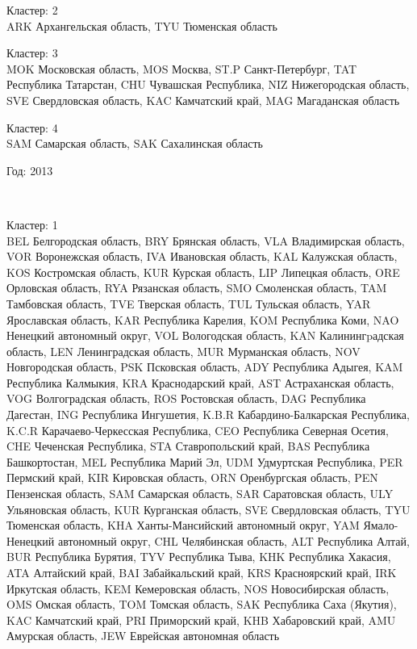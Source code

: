 \documentclass[11pt]{article}
\begin{document}
Кластер:  2 \\
ARK Архангельская область, TYU Тюменская область

Кластер:  3 \\
MOK Московская область, MOS Москва, ST.P Санкт-Петербург, TAT Республика Татарстан, CHU Чувашская Республика, NIZ Нижегородская область, SVE Свердловская область, KAC Камчатский край, MAG Магаданская область

Кластер:  4 \\
SAM Самарская область, SAK Сахалинская область


\begin{center}
Год:  2013
\end{center}


    \begin{center}
    \end{center}
    { \hspace*{\fill} \\}
    

Кластер:  1 \\
BEL Белгородская область, BRY Брянская область, VLA Владимирская область, VOR Воронежская область, IVA Ивановская область, KAL Калужская область, KOS Костромская область, KUR Курская область, LIP Липецкая область, ORE Орловская область, RYA Рязанская область, SMO Смоленская область, TAM Тамбовская область, TVE Тверская область, TUL Тульская область, YAR Ярославская область, KAR Республика Карелия, KOM Республика Коми, NAO Ненецкий автономный округ, VOL Вологодская область, KAN Калинингpадская область, LEN Ленинградская область, MUR Мурманская область, NOV Новгородская область, PSK Псковская область, ADY Республика Адыгея, KAM Республика Калмыкия, KRA Краснодарский край, AST Астраханская область, VOG Волгоградская область, ROS Ростовская область, DAG Республика Дагестан, ING Республика Ингушетия, K.B.R Кабардино-Балкарская Республика, K.C.R Карачаево-Черкесская Республика, CEO Республика Северная Осетия, CHE Чеченская Республика, STA Ставропольский край, BAS Республика Башкортостан, MEL Республика Марий Эл, UDM Удмуртская Республика, PER Пермский край, KIR Кировская область, ORN Оренбургская область, PEN Пензенская область, SAM Самарская область, SAR Саратовская область, ULY Ульяновская область, KUR Курганская область, SVE Свердловская область, TYU Тюменская область, KHA Ханты-Мансийский автономный округ, YAM Ямало-Ненецкий автономный округ, CHL Челябинская область, ALT Республика Алтай, BUR Республика Бурятия, TYV Республика Тыва, KHK Республика Хакасия, ATA Алтайский край, BAI Забайкальский край, KRS Красноярский край, IRK Иркутская область, KEM Кемеровская область, NOS Новосибирская область, OMS Омская область, TOM Томская область, SAK Республика Саха (Якутия), KAC Камчатский край, PRI Приморский край, KHB Хабаровский край, AMU Амурская область, JEW Еврейская автономная область
\end{document}
